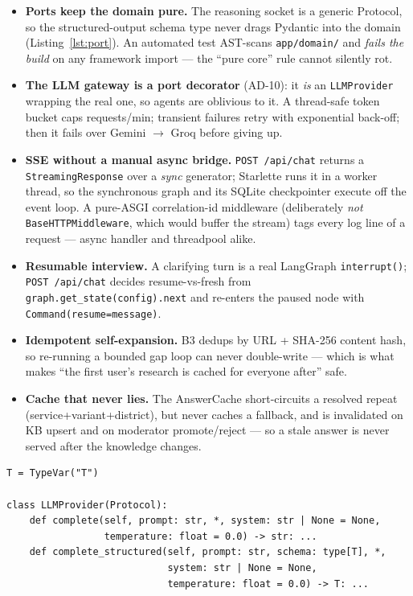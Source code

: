 \documentclass[11pt,a4paper]{article}
\begin{document}
\begin{itemize}[leftmargin=1.4em]
  \item \textbf{Ports keep the domain pure.} The reasoning socket is a generic Protocol, so the
        structured-output schema type never drags Pydantic into the domain (Listing~\ref{lst:port}).
        An automated test AST-scans \texttt{app/domain/} and \emph{fails the build} on any framework
        import --- the ``pure core'' rule cannot silently rot.
  \item \textbf{The LLM gateway is a port decorator} (AD-10): it \emph{is} an \texttt{LLMProvider}
        wrapping the real one, so agents are oblivious to it. A thread-safe token bucket caps
        requests/min; transient failures retry with exponential back-off; then it fails over
        Gemini $\to$ Groq before giving up.
  \item \textbf{SSE without a manual async bridge.} \texttt{POST /api/chat} returns a
        \texttt{StreamingResponse} over a \emph{sync} generator; Starlette runs it in a worker thread,
        so the synchronous graph and its SQLite checkpointer execute off the event loop. A pure-ASGI
        correlation-id middleware (deliberately \emph{not} \texttt{BaseHTTPMiddleware}, which would
        buffer the stream) tags every log line of a request --- async handler and threadpool alike.
  \item \textbf{Resumable interview.} A clarifying turn is a real LangGraph \texttt{interrupt()};
        \texttt{POST /api/chat} decides resume-vs-fresh from \texttt{graph.get\_state(config).next} and
        re-enters the paused node with \texttt{Command(resume=message)}.
  \item \textbf{Idempotent self-expansion.} B3 dedups by URL + SHA-256 content hash, so re-running a
        bounded gap loop can never double-write --- which is what makes ``the first user's research is
        cached for everyone after'' safe.
  \item \textbf{Cache that never lies.} The AnswerCache short-circuits a resolved repeat
        (service+variant+district), but never caches a fallback, and is invalidated on KB upsert and on
        moderator promote/reject --- so a stale answer is never served after the knowledge changes.
\end{itemize}

\begin{lstlisting}[caption={A domain port --- generic structured output keeps Pydantic out of the domain.},label={lst:port}]
T = TypeVar("T")

class LLMProvider(Protocol):
    def complete(self, prompt: str, *, system: str | None = None,
                 temperature: float = 0.0) -> str: ...
    def complete_structured(self, prompt: str, schema: type[T], *,
                            system: str | None = None,
                            temperature: float = 0.0) -> T: ...
\end{lstlisting}
\end{document}
